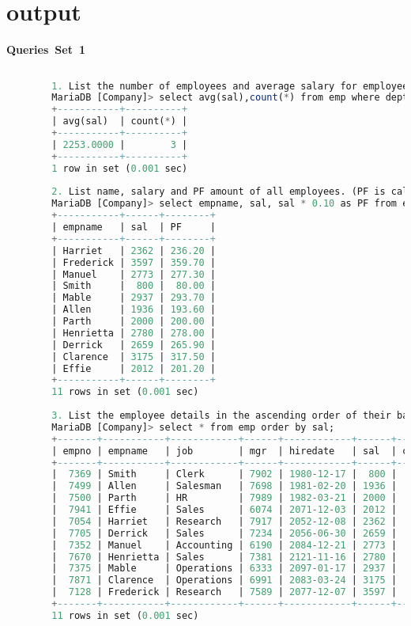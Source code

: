 \documentclass{article}
\begin{document}
	\section{\textbf{output}} 
	\textbf{Queries Set 1} 
	\begin{lstlisting}[language=SQL] 
		
		1. List the number of employees and average salary for employees in department 20 
		MariaDB [Company]> select avg(sal),count(*) from emp where deptno=20; 
		+-----------+----------+ 
		| avg(sal)  | count(*) | 
		+-----------+----------+ 
		| 2253.0000 |        3 | 
		+-----------+----------+ 
		1 row in set (0.001 sec) 
		
		2. List name, salary and PF amount of all employees. (PF is calculated as 10% of basic salary) 
		MariaDB [Company]> select empname, sal, sal * 0.10 as PF from emp; 
		+-----------+------+--------+ 
		| empname   | sal  | PF     | 
		+-----------+------+--------+ 
		| Harriet   | 2362 | 236.20 | 
		| Frederick | 3597 | 359.70 | 
		| Manuel    | 2773 | 277.30 | 
		| Smith     |  800 |  80.00 | 
		| Mable     | 2937 | 293.70 | 
		| Allen     | 1936 | 193.60 | 
		| Parth     | 2000 | 200.00 | 
		| Henrietta | 2780 | 278.00 | 
		| Derrick   | 2659 | 265.90 | 
		| Clarence  | 3175 | 317.50 | 
		| Effie     | 2012 | 201.20 | 
		+-----------+------+--------+ 
		11 rows in set (0.001 sec) 
		
		3. List the employee details in the ascending order of their basic salary. 
		MariaDB [Company]> select * from emp order by sal; 
		+-------+-----------+------------+------+------------+------+------+--------+ 
		| empno | empname   | job        | mgr  | hiredate   | sal  | comm | deptno | 
		+-------+-----------+------------+------+------------+------+------+--------+ 
		|  7369 | Smith     | Clerk      | 7902 | 1980-12-17 |  800 |  300 |     20 | 
		|  7499 | Allen     | Salesman   | 7698 | 1981-02-20 | 1936 |  300 |     30 | 
		|  7500 | Parth     | HR         | 7989 | 1982-03-21 | 2000 |  300 |     40 | 
		|  7941 | Effie     | Sales      | 6074 | 2071-12-03 | 2012 |  265 |     30 | 
		|  7054 | Harriet   | Research   | 7917 | 2052-12-08 | 2362 |  229 |     20 | 
		|  7705 | Derrick   | Sales      | 7234 | 2056-06-30 | 2659 |  208 |     30 | 
		|  7352 | Manuel    | Accounting | 6190 | 2084-12-21 | 2773 |  253 |     10 | 
		|  7670 | Henrietta | Sales      | 7381 | 2121-11-16 | 2780 |  217 |     30 | 
		|  7375 | Mable     | Operations | 6333 | 2097-01-17 | 2937 |  210 |     40 | 
		|  7871 | Clarence  | Operations | 6991 | 2083-03-24 | 3175 |  228 |     40 | 
		|  7128 | Frederick | Research   | 7589 | 2077-12-07 | 3597 |  203 |     20 | 
		+-------+-----------+------------+------+------------+------+------+--------+ 
		11 rows in set (0.001 sec) 
		

\end{lstlisting}
\end{document}
